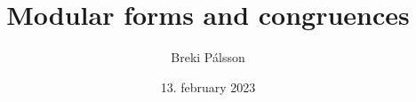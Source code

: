 \documentclass{article}
\begin{document}
\title{Modular forms and congruences}
\author{Breki Pálsson}
\date{13. february 2023}

\maketitle




\printindex
{}
\end{document}
